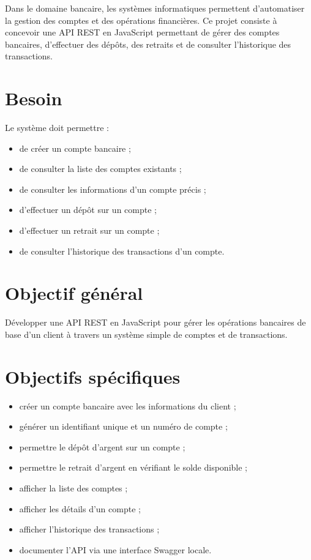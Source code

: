 \documentclass[12pt,a4paper]{article}
\begin{document}
Dans le domaine bancaire, les systèmes informatiques permettent d'automatiser la gestion des comptes et des opérations financières. Ce projet consiste à concevoir une API REST en JavaScript permettant de gérer des comptes bancaires, d'effectuer des dépôts, des retraits et de consulter l'historique des transactions.

\section{Besoin}

Le système doit permettre :

\begin{itemize}
    \item de créer un compte bancaire ;
    \item de consulter la liste des comptes existants ;
    \item de consulter les informations d'un compte précis ;
    \item d'effectuer un dépôt sur un compte ;
    \item d'effectuer un retrait sur un compte ;
    \item de consulter l'historique des transactions d'un compte.
\end{itemize}

\section{Objectif général}

Développer une API REST en JavaScript pour gérer les opérations bancaires de base d'un client à travers un système simple de comptes et de transactions.

\section{Objectifs spécifiques}

\begin{itemize}
    \item créer un compte bancaire avec les informations du client ;
    \item générer un identifiant unique et un numéro de compte ;
    \item permettre le dépôt d'argent sur un compte ;
    \item permettre le retrait d'argent en vérifiant le solde disponible ;
    \item afficher la liste des comptes ;
    \item afficher les détails d'un compte ;
    \item afficher l'historique des transactions ;
    \item documenter l'API via une interface Swagger locale.
\end{itemize}
\end{document}
